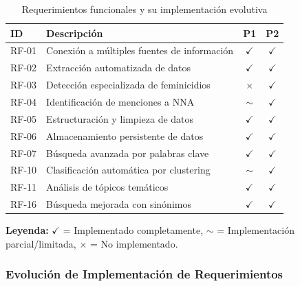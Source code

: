\begin{table}[h]
\centering
\caption{Requerimientos funcionales y su implementación evolutiva}
\begin{tabular}{|p{1.5cm}|p{5cm}|c|c|}
\hline
\textbf{ID} & \textbf{Descripción} & \textbf{P1} & \textbf{P2} \\ \hline
RF-01 & Conexión a múltiples fuentes de información & $\checkmark$ & $\checkmark$ \\ \hline
RF-02 & Extracción automatizada de datos & $\checkmark$ & $\checkmark$ \\ \hline
RF-03 & Detección especializada de feminicidios & $\times$ & $\checkmark$ \\ \hline
RF-04 & Identificación de menciones a NNA & $\sim$ & $\checkmark$ \\ \hline
RF-05 & Estructuración y limpieza de datos & $\checkmark$ & $\checkmark$ \\ \hline
RF-06 & Almacenamiento persistente de datos & $\checkmark$ & $\checkmark$ \\ \hline
RF-07 & Búsqueda avanzada por palabras clave & $\checkmark$ & $\checkmark$ \\ \hline
RF-10 & Clasificación automática por clustering & $\sim$ & $\checkmark$ \\ \hline
RF-11 & Análisis de tópicos temáticos & $\checkmark$ & $\checkmark$ \\ \hline
RF-16 & Búsqueda mejorada con sinónimos & $\checkmark$ & $\checkmark$ \\ \hline
\end{tabular}
\end{table}

\textbf{Leyenda:} $\checkmark$ = Implementado completamente, $\sim$ = Implementación parcial/limitada, $\times$ = No implementado.

\subsubsection{Evolución de Implementación de Requerimientos}

